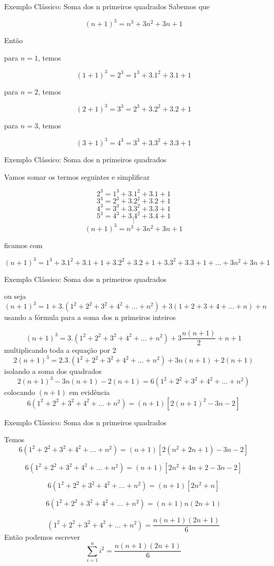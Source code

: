 \documentclass{beamer} %
\begin{document}
\begin{frame}{Exemplo Clássico: Soma dos n primeiros quadrados}
Sabemos que 
	
	$$
	(n+1)^3=n^3+3n^2+3n+1
	$$
	
	Então 
	
	para $n=1$, temos
	
	$$(1+1)^3 = 2^3 = 1^3+3.1^2+3.1+1$$
	
	para $n=2$, temos
	
	$$(2+1)^3 = 3^3 = 2^3+3.2^2+3.2+1$$
	
	para $n=3$, temos
	
	$$(3+1)^3 = 4^3 = 3^3+3.3^2+3.3+1$$

\end{frame}
    
\begin{frame}{Exemplo Clássico: Soma dos n primeiros quadrados}
	
	Vamos somar os termos seguintes e simplificar
	
	$$2^3 = 1^3+3.1^2+3.1+1$$
	$$3^3 = 2^3+3.2^2+3.2+1$$
	$$4^3 = 3^3+3.3^2+3.3+1$$
	$$5^3 = 4^3+3.4^2+3.4+1$$
	$$\vdots$$
	$$(n+1)^3=n^3+3n^2+3n+1$$
	
	ficamos com
	
	$$(n+1)^3 = 1^3 + 3.1^2+3.1+1 + 3.2^2+3.2+1 + 3.3^2+3.3+1 + ... +
	3n^2+3n+1$$

    \end{frame}

\begin{frame}{Exemplo Clássico: Soma dos n primeiros quadrados}
        
	ou seja
	$$(n+1)^3 = 1 + 3.(1^2 + 2^2 + 3^2 + 4^2 + ...+ n^2) + 3( 1+2+3+4+...+n) + n $$
	usando a fórmula para a soma dos n primeiros inteiros
	
	$$(n+1)^3 = 3.(1^2 + 2^2 + 3^2 + 4^2 + ...+ n^2) + 3\frac{n(n+1)}{2} + n + 1 $$
	multiplicando toda a equação por 2
	$$2(n+1)^3 = 2.3.(1^2 + 2^2 + 3^2 + 4^2 + ...+ n^2) + 3n(n+1) + 2(n+1) $$
	isolando a soma dos quadrados
	$$2(n+1)^3 - 3n(n+1) - 2(n+1) = 6(1^2 + 2^2 + 3^2 + 4^2 + ...+ n^2)$$
	colocando $(n+1)$ em evidência
	$$6(1^2 + 2^2 + 3^2 + 4^2 + ...+ n^2) = (n+1)[2(n+1)^2 - 3n - 2]$$
	
    \end{frame}

\begin{frame}{Exemplo Clássico: Soma dos n primeiros quadrados}
    
    Temos
	$$6(1^2 + 2^2 + 3^2 + 4^2 + ...+ n^2) = (n+1)[2(n^2+2n+1) - 3n - 2]$$
	
	$$6(1^2 + 2^2 + 3^2 + 4^2 + ...+ n^2) = (n+1)[2n^2+4n+2 - 3n - 2]$$
	
	$$6(1^2 + 2^2 + 3^2 + 4^2 + ...+ n^2) = (n+1)[2n^2+n]$$
	
	$$6(1^2 + 2^2 + 3^2 + 4^2 + ...+ n^2) = (n+1)n(2n+1)$$
	
	$$(1^2 + 2^2 + 3^2 + 4^2 + ...+ n^2) = \frac{n(n+1)(2n+1)}{6}$$
	Então podemos escrever
		\[
	\sum_{i=1}^{n} i^2 = \frac{n(n+1)(2n+1)}{6}
	\]
	
    
\end{frame}
\end{document}
